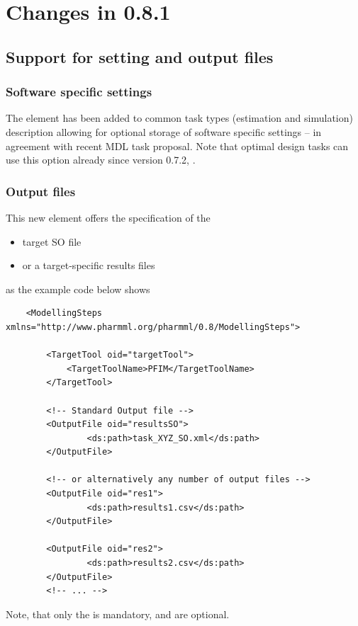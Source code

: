 
\chapter{Changes in 0.8.1}
\label{ch:081changes}


\section{Support for setting and output files}
\label{sec:filesSupport}

\subsection{Software specific settings}

The element  has been added to common 
task types (estimation and simulation) description allowing for optional storage of software 
specific settings -- in agreement with recent MDL task proposal. 
Note that optimal design tasks can use this option already since version 0.7.2, \cite{Swat:2015b}. 


\subsection{Output files}
This new element  offers the specification of the 
\begin{itemize}
\item 
target SO file
\item 
or a target-specific results files
\end{itemize}
as the example code below shows
\lstset{language=XML}
\begin{lstlisting}
    <ModellingSteps xmlns="http://www.pharmml.org/pharmml/0.8/ModellingSteps">
        
        <TargetTool oid="targetTool">
            <TargetToolName>PFIM</TargetToolName>
        </TargetTool>

        <!-- Standard Output file -->
        <OutputFile oid="resultsSO">
                <ds:path>task_XYZ_SO.xml</ds:path>
        </OutputFile>

        <!-- or alternatively any number of output files -->
        <OutputFile oid="res1">
                <ds:path>results1.csv</ds:path>
        </OutputFile>

        <OutputFile oid="res2">
                <ds:path>results2.csv</ds:path>
        </OutputFile>
        <!-- ... -->        
\end{lstlisting}
Note, that only the  is mandatory,  and 
are optional.

